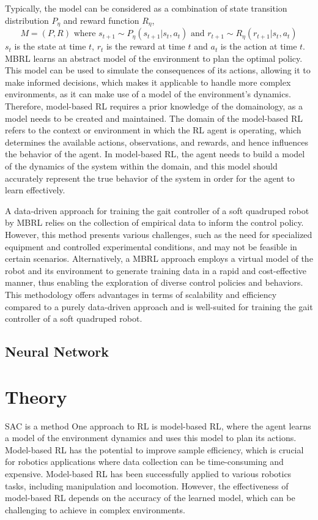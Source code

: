 Typically, the model can be considered as a combination of state transition distribution $P_\eta$ and reward function $R_\eta$, $$M = (P,R) \textrm{ where } s_{t+1}\sim P_\eta(s_{t+1}|s_t, a_t) \textrm{ and } r_{t+1}\sim R_\eta(r_{t+1}|s_t, a_t)$$ $s_t$ is the state at time $t$, $r_t$ is the reward at time $t$ and $a_t$ is the action at time $t$. \ac{MBRL} learns an abstract model of the environment to plan the optimal policy. This model can be used to simulate the consequences of its actions, allowing it to make informed decisions, which makes it applicable to handle more complex environments, as it can make use of a model of the environment's dynamics. Therefore, model-based \ac{RL} requires a prior knowledge of the domainology\cite{tangModelbasedOnlineLearning2021}, as a model needs to be created and maintained. The domain of the model-based \ac{RL} refers to the context or environment in which the \ac{RL} agent is operating, which determines the available actions, observations, and rewards, and hence influences the behavior of the agent\cite{langExplorationRelationalDomains}. In model-based \ac{RL}, the agent needs to build a model of the dynamics of the system within the domain, and this model should accurately represent the true behavior of the system in order for the agent to learn effectively.

A data-driven approach for training the gait controller of a soft quadruped robot by \ac{MBRL} relies on the collection of empirical data to inform the control policy. However, this method presents various challenges, such as the need for specialized equipment and controlled experimental conditions, and may not be feasible in certain scenarios. Alternatively, a \ac{MBRL} approach employs a virtual model of the robot and its environment to generate training data in a rapid and cost-effective manner, thus enabling the exploration of diverse control policies and behaviors. This methodology offers advantages in terms of scalability and efficiency compared to a purely data-driven approach and is well-suited for training the gait controller of a soft quadruped robot. 

\subsection{Neural Network}

\section{Theory}
\ac{SAC} is a method
One approach to RL is model-based RL, where the agent learns a model of the environment dynamics and uses this model to plan its actions. Model-based RL has the potential to improve sample efficiency, which is crucial for robotics applications where data collection can be time-consuming and expensive. Model-based RL has been successfully applied to various robotics tasks, including manipulation and locomotion. However, the effectiveness of model-based RL depends on the accuracy of the learned model, which can be challenging to achieve in complex environments.

